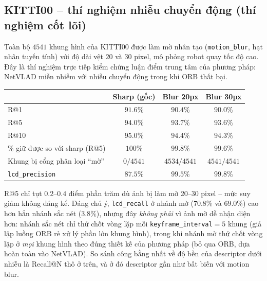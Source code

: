 \documentclass[a4paper,12pt]{article}
\begin{document}
\subsection{KITTI00 -- thí nghiệm nhiễu chuyển động (thí nghiệm cốt lõi)}
Toàn bộ $4541$ khung hình của KITTI00 được làm mờ nhân tạo (\texttt{motion\_blur}, hạt nhân tuyến tính) với độ dài vệt $20$ và $30$ pixel, mô phỏng robot quay tốc độ cao. Đây là thí nghiệm trực tiếp kiểm chứng luận điểm trung tâm của phương pháp: NetVLAD miễn nhiễm với nhiễu chuyển động trong khi ORB thất bại.
\begin{center}
\begin{tabular}{lccc}
\toprule
& Sharp (gốc) & Blur 20px & Blur 30px \\
\midrule
R@1 & $91.6\%$ & $90.4\%$ & $90.0\%$ \\
R@5 & $94.0\%$ & $93.7\%$ & $93.6\%$ \\
R@10 & $95.0\%$ & $94.4\%$ & $94.3\%$ \\
\% giữ được so với sharp (R@5) & $100\%$ & $99.8\%$ & $99.6\%$ \\
Khung bị cổng phân loại ``mờ'' & $0/4541$ & $4534/4541$ & $4541/4541$ \\
\texttt{lcd\_precision} & $87.5\%$ & $99.5\%$ & $99.8\%$ \\
\bottomrule
\end{tabular}
\end{center}
R@5 chỉ tụt $0.2$--$0.4$ điểm phần trăm dù ảnh bị làm mờ 20--30 pixel -- mức suy giảm không đáng kể. Đáng chú ý, \texttt{lcd\_recall} ở nhánh mờ ($70.8\%$ và $69.0\%$) cao hơn hẳn nhánh sắc nét ($3.8\%$), nhưng đây \emph{không phải} vì ảnh mờ dễ nhận diện hơn: nhánh sắc nét chỉ thử chốt vòng lặp mỗi \texttt{keyframe\_interval}$=5$ khung (giả lập luồng ORB rẻ xử lý phần lớn khung hình), trong khi nhánh mờ thử chốt vòng lặp ở \emph{mọi} khung hình theo đúng thiết kế của phương pháp (bỏ qua ORB, dựa hoàn toàn vào NetVLAD). So sánh công bằng nhất về độ bền của descriptor dưới nhiễu là Recall@N thô ở trên, và ở đó descriptor gần như bất biến với motion blur.
\end{document}
